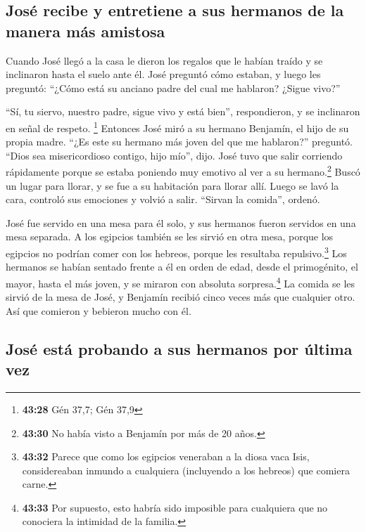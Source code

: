 \hypertarget{josuxe9-recibe-y-entretiene-a-sus-hermanos-de-la-manera-muxe1s-amistosa}{%
\subsection{José recibe y entretiene a sus hermanos de la manera más
amistosa}\label{josuxe9-recibe-y-entretiene-a-sus-hermanos-de-la-manera-muxe1s-amistosa}}

 Cuando José llegó a la casa le dieron los regalos que le
habían traído y se inclinaron hasta el suelo ante él. 
José preguntó cómo estaban, y luego les preguntó: ``¿Cómo está su
anciano padre del cual me hablaron? ¿Sigue vivo?''

 ``Sí, tu siervo, nuestro padre, sigue vivo y está
bien'', respondieron, y se inclinaron en señal de respeto. \footnote{\textbf{43:28}
  Gén 37,7; Gén 37,9}  Entonces José miró a su hermano
Benjamín, el hijo de su propia madre. ``¿Es este su hermano más joven
del que me hablaron?'' preguntó. ``Dios sea misericordioso contigo, hijo
mío'', dijo.  José tuvo que salir corriendo rápidamente
porque se estaba poniendo muy emotivo al ver a su hermano.\footnote{\textbf{43:30}
  No había visto a Benjamín por más de 20 años.} Buscó un lugar para
llorar, y se fue a su habitación para llorar allí.  Luego
se lavó la cara, controló sus emociones y volvió a salir. ``Sirvan la
comida'', ordenó.

 José fue servido en una mesa para él solo, y sus
hermanos fueron servidos en una mesa separada. A los egipcios también se
les sirvió en otra mesa, porque los egipcios no podrían comer con los
hebreos, porque les resultaba repulsivo.\footnote{\textbf{43:32} Parece
  que como los egipcios veneraban a la diosa vaca Isis, considereaban
  inmundo a cualquiera (incluyendo a los hebreos) que comiera carne.}
 Los hermanos se habían sentado frente a él en orden de
edad, desde el primogénito, el mayor, hasta el más joven, y se miraron
con absoluta sorpresa.\footnote{\textbf{43:33} Por supuesto, esto habría
  sido imposible para cualquiera que no conociera la intimidad de la
  familia.}  La comida se les sirvió de la mesa de José,
y Benjamín recibió cinco veces más que cualquier otro. Así que comieron
y bebieron mucho con él.

\hypertarget{josuxe9-estuxe1-probando-a-sus-hermanos-por-uxfaltima-vez}{%
\subsection{José está probando a sus hermanos por última
vez}\label{josuxe9-estuxe1-probando-a-sus-hermanos-por-uxfaltima-vez}}

